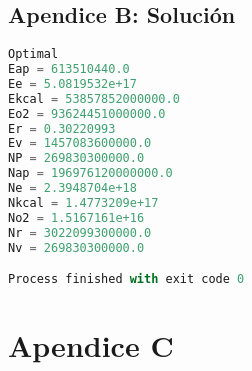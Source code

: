 \documentclass[12pt]{report}
\begin{document}
\subsection*{Apendice B: Soluci\'on}

\begin{lstlisting}[language=Python, frame=single, basicstyle=\tiny]
Optimal
Eap = 613510440.0
Ee = 5.0819532e+17
Ekcal = 53857852000000.0
Eo2 = 93624451000000.0
Er = 0.30220993
Ev = 1457083600000.0
NP = 269830300000.0
Nap = 196976120000000.0
Ne = 2.3948704e+18
Nkcal = 1.4773209e+17
No2 = 1.5167161e+16
Nr = 3022099300000.0
Nv = 269830300000.0

Process finished with exit code 0
\end{lstlisting}

\newpage
\section*{Apendice C}
\end{document}
